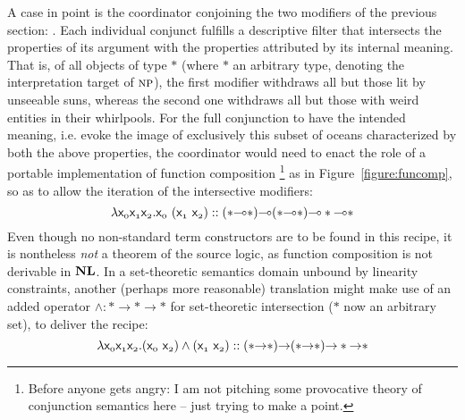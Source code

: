 A case in point is the coordinator  conjoining the two modifiers of the previous section: .
Each individual conjunct fulfills a descriptive filter that intersects the properties of its argument with the properties attributed by its internal meaning.
That is, of all objects of type $*$ (where $*$ an arbitrary type, denoting the interpretation target of $\normalfont\textsc{np}$), the first modifier withdraws all but those lit by unseeable suns, whereas the second one withdraws all but those with weird entities in their whirlpools.
For the full conjunction to have the intended meaning, i.e. evoke the image of exclusively this subset of oceans characterized by both the above properties, the coordinator would need to enact the role of a portable implementation of function composition%
\footnote{Before anyone gets angry: I am not pitching some provocative theory of conjunction semantics here -- just trying to make a point.} as in Figure~\ref{figure:funcomp}, so as to allow the iteration of the intersective modifiers:
\begin{equation}\label{equation:funcomp}
\lam \smallterm{\Var{0}\Var{1}\Var{2}.\Var{0}~(\Var{1}~\Var{2})} :: (*\li *)\li(*\li *)\li * \li *
\end{equation}
Even though no non-standard term constructors are to be found in this recipe, it is nontheless \textit{not} a theorem of the source logic, as function composition is not derivable in $\textbf{NL}$.
In a set-theoretic semantics domain unbound by linearity constraints, another (perhaps more reasonable) translation might make use of an added operator $\wedge : * \to * \to *$ for set-theoretic intersection ($*$ now an arbitrary set), to deliver the recipe:
\begin{equation}
\lam \smallterm{\Var{0}\Var{1}\Var{2}.(\Var{0}~\Var{2})\wedge(\Var{1}~\Var{2})} :: (*\ii *)\ii(*\ii *)\ii * \ii *
\end{equation}

